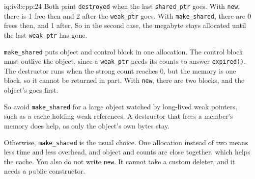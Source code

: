 \begin{solution}{iq:iv3:cpp:24}
Both print \texttt{destroyed} when the last \texttt{shared\_ptr} goes. With \texttt{new}, there is 1 free then and 2 after the \texttt{weak\_ptr} goes. With \texttt{make\_shared}, there are 0 frees then, and 1 after. So in the second case, the megabyte stays allocated until the last \texttt{weak\_ptr} has gone.

\texttt{make\_shared} puts object and control block in one allocation. The control block must outlive the object, since a \texttt{weak\_ptr} needs its counts to answer \texttt{expired()}. The destructor runs when the strong count reaches 0, but the memory is one block, so it cannot be returned in part. With \texttt{new}, there are two blocks, and the object's goes first.

So avoid \texttt{make\_shared} for a large object watched by long-lived weak pointers, such as a cache holding weak references. A destructor that frees a member's memory does help, as only the object's own bytes stay.

Otherwise, \texttt{make\_shared} is the usual choice. One allocation instead of two means less time and less overhead, and object and counts are close together, which helps the cache. You also do not write \texttt{new}. It cannot take a custom deleter, and it needs a public constructor.

\end{solution}

